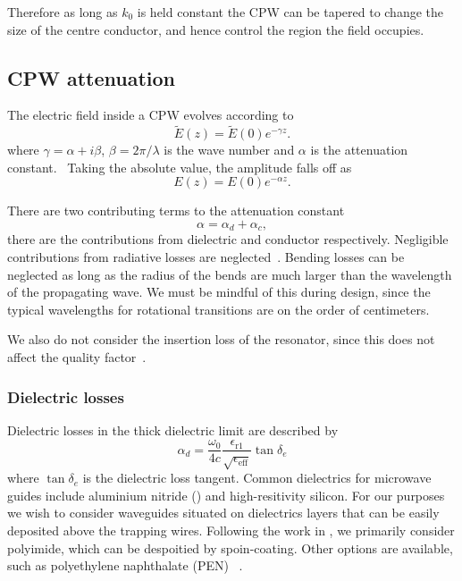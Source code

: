Therefore as long as $k_0$ is held constant the CPW can be tapered to change the
size of the centre conductor, and hence control the region the field occupies.

\subsection{CPW attenuation}

The electric field inside a CPW evolves according to
%
\begin{equation}
  \widetilde{E}(z) = \widetilde{E}(0)e^{-\gamma z}.
  \label{mws:eqn:Eloss}
\end{equation}
%
where $\gamma = \alpha + i\beta$, $\beta = 2\pi / \lambda$ is the wave
number and $\alpha$ is the attenuation constant.~\cite{Simons2004}
Taking the absolute value, the amplitude falls off as
%
\begin{equation}
  E(z) = E(0)e^{-\alpha z}.
\end{equation}

There are two contributing terms to the attenuation constant
%
\begin{equation}
  \alpha = \alpha_d + \alpha_c,
\end{equation}
%
there are the contributions from dielectric and conductor respectively.
Negligible contributions from radiative losses are
neglected~\cite{Frankel1991}.  Bending losses can be neglected as long as
the radius of the bends are much larger than the wavelength of the propagating
wave. We must be mindful of this during design, since the typical wavelengths
for rotational transitions are on the order of centimeters.

We also do not consider the insertion loss of the
resonator, since this does not affect the quality
factor~\cite{doi:10.1063/1.3010859}.

\subsubsection{Dielectric losses}

Dielectric losses in the thick dielectric limit are described
by ~\cite{Collin2007}
\begin{equation}
  \alpha_d =
  \frac{\omega_0}{4c}\frac{\epsilon_\mathrm{r1}}{\sqrt{\epsilon_\mathrm{eff}}}
  \tan \delta_e
\end{equation}
%
where $\tan\delta_e$ is the dielectric loss tangent. Common dielectrics for
microwave guides include aluminium nitride (\AlN{}) and high-resitivity
silicon.  For our purposes we wish to consider waveguides situated on
dielectrics layers that can be easily deposited above the trapping wires.
Following the work in , we primarily consider polyimide, which
can be despoitied by spoin-coating. Other options are available, such as
polyethylene naphthalate (PEN) ~\cite{WEI20169937}.

